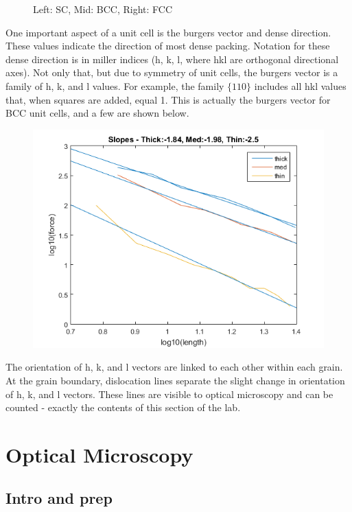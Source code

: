 \documentclass{article}
\begin{document}
\begin{figure}[h]
\begin{minipage}{0.32\textwidth}
	\end{minipage}
	\caption{Left: SC, Mid: BCC, Right: FCC}
\end{figure}

One important aspect of a unit cell is the burgers vector and dense direction. These values indicate the direction of most dense packing. Notation for these dense direction is in miller indices (h, k, l, where hkl are orthogonal directional axes). Not only that, but due to symmetry of unit cells, the burgers vector is a family of h, k, and l values. For example, the family $\{1 1 0\}$ includes all hkl values that, when squares are added, equal 1. This is actually the burgers vector for BCC unit cells, and a few are shown below.

\begin{figure}[h]
	\centering
	\includegraphics[scale=.3]{Lab1f1.png}
\end{figure}

The orientation of h, k, and l vectors are linked to each other within each grain. At the grain boundary, dislocation lines separate the slight change in orientation of h, k, and l vectors. These lines are visible to optical microscopy and can be counted - exactly the contents of this section of the lab.

\section{Optical Microscopy}

\subsection{Intro and prep}
\end{document}
